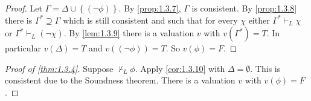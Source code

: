 \documentclass{article}
\newcommand{\rb}[1]{\left( #1 \right)}
\newcommand{\cb}[1]{\left\{ #1 \right\}}
\newcommand{\notb}[1]{\rb{\neg #1}}
\theoremstyle{definition}\newtheorem{definition}{Definition}[subsection]
\theoremstyle{definition}\newtheorem{remark}[definition]{Remark}
\theoremstyle{definition}\newtheorem*{example}{Example}
\theoremstyle{definition}\newtheorem*{note}{Note}
\begin{document}
\begin{proof}
Let $ \Gamma = \Delta \cup \cb{\notb{\phi}} $. By \ref{prop:1.3.7}, $ \Gamma $ is consistent. By \ref{prop:1.3.8} there is $ \Gamma^* \supseteq \Gamma $ which is still consistent and such that for every $ \chi $ either $ \Gamma^* \vdash_L \chi $ or $ \Gamma^* \vdash_L \notb{\chi} $. By \ref{lem:1.3.9} there is a valuation $ v $ with $ v\rb{\Gamma^*} = T $. In particular $ v\rb{\Delta} = T $ and $ v\rb{\notb{\phi}} = T $. So $ v\rb{\phi} = F $.
\end{proof}

\begin{proof}[Proof of \ref{thm:1.3.4}]
Suppose $ \not\vdash_L \phi $. Apply \ref{cor:1.3.10} with $ \Delta = \emptyset $. This is consistent due to the Soundness theorem. There is a valuation $ v $ with $ v\rb{\phi} = F $.
\end{proof}
\end{document}
